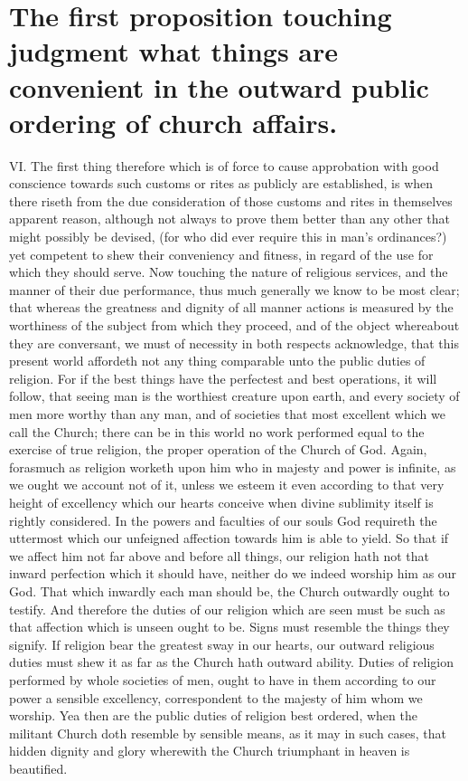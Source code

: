 \section*{The first proposition touching judgment what things are convenient in the outward public ordering of church affairs.}
VI. The first thing therefore which is of force to cause approbation with good conscience towards such customs or rites as publicly are established, is when there riseth from the due consideration of those customs and rites in themselves apparent reason, although not always to prove them better than any other that might possibly be devised, (for who did ever require this in man’s ordinances?) yet competent to shew their conveniency and fitness, in regard of the use for which they should serve.
Now touching the nature of religious services, and the manner of their due performance, thus much generally we know to be most clear; that whereas the greatness and dignity  of all manner actions is measured by the worthiness of the subject from which they proceed, and of the object whereabout they are conversant, we must of necessity in both respects acknowledge, that this present world affordeth not any thing comparable unto the public duties of religion. For if the best things have the perfectest and best operations, it will follow, that seeing man is the worthiest creature upon earth, and every society of men more worthy than any man, and of societies that most excellent which we call the Church; there can be in this world no work performed equal to the exercise of true religion, the proper operation of the Church of God.
Again, forasmuch as religion worketh upon him who in majesty and power is infinite, as we ought we account not of it, unless we esteem it even according to that very height of excellency which our hearts conceive when divine sublimity itself is rightly considered. In the powers and faculties of our souls God requireth the uttermost which our unfeigned affection towards him is able to yield. So that if we affect him not far above and before all things, our religion hath not that inward perfection which it should have, neither do we indeed worship him as our God.
That which inwardly each man should be, the Church outwardly ought to testify. And therefore the duties of our religion which are seen must be such as that affection which is unseen ought to be. Signs must resemble the things they signify. If religion bear the greatest sway in our hearts, our outward religious duties must shew it as far as the Church hath outward ability. Duties of religion performed by whole societies of men, ought to have in them according to our power a sensible excellency, correspondent to the majesty of him whom we worship. Yea then are the public duties of religion best ordered, when the militant Church doth resemble by sensible means, as it may in such cases, that hidden  dignity and glory wherewith the Church triumphant in heaven is beautified.
